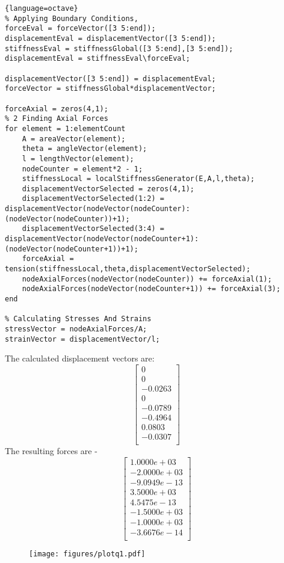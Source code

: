 \documentclass{article}
\begin{document}
\begin{lstlisting}{language=octave}
% Applying Boundary Conditions,
forceEval = forceVector([3 5:end]);
displacementEval = displacementVector([3 5:end]);
stiffnessEval = stiffnessGlobal([3 5:end],[3 5:end]);
displacementEval = stiffnessEval\forceEval;

displacementVector([3 5:end]) = displacementEval;
forceVector = stiffnessGlobal*displacementVector;

forceAxial = zeros(4,1);
% 2 Finding Axial Forces
for element = 1:elementCount
    A = areaVector(element);
    theta = angleVector(element);
    l = lengthVector(element);
    nodeCounter = element*2 - 1;
    stiffnessLocal = localStiffnessGenerator(E,A,l,theta);
    displacementVectorSelected = zeros(4,1);
    displacementVectorSelected(1:2) = displacementVector(nodeVector(nodeCounter):(nodeVector(nodeCounter))+1);
    displacementVectorSelected(3:4) = displacementVector(nodeVector(nodeCounter+1):(nodeVector(nodeCounter+1))+1);
    forceAxial = tension(stiffnessLocal,theta,displacementVectorSelected);
    nodeAxialForces(nodeVector(nodeCounter)) += forceAxial(1);
    nodeAxialForces(nodeVector(nodeCounter+1)) += forceAxial(3);
end

% Calculating Stresses And Strains
stressVector = nodeAxialForces/A;
strainVector = displacementVector/l;
\end{lstlisting}

The calculated displacement vectors are:
\[
\begin{bmatrix}
0 \\
    0 \\
-0.0263 \\
    0 \\
-0.0789 \\
-0.4964 \\
0.0803 \\
-0.0307   \\
\end{bmatrix}
\]
The resulting forces are - 
\[
    \begin{bmatrix}
  1.0000e+03 \\
  -2.0000e+03 \\
  -9.0949e-13 \\
   3.5000e+03 \\
   4.5475e-13 \\
  -1.5000e+03 \\
  -1.0000e+03 \\
  -3.6676e-14    \\
    \end{bmatrix}
\]
\begin{figure}[h]
        \texttt{[image: figures/plotq1.pdf]}
\end{figure}
\end{document}
